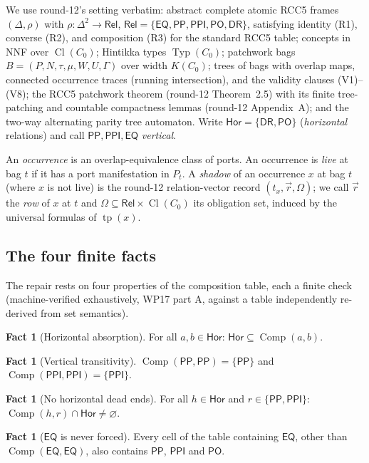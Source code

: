 \documentclass[11pt]{article}
\theoremstyle{definition}
\newtheorem{fact}[theorem]{Fact}
\newcommand{\EQ}{\mathsf{EQ}}
\newcommand{\PP}{\mathsf{PP}}
\newcommand{\PPI}{\mathsf{PPI}}
\newcommand{\PO}{\mathsf{PO}}
\newcommand{\DR}{\mathsf{DR}}
\newcommand{\Rel}{\mathsf{Rel}}
\newcommand{\Hor}{\mathsf{Hor}}
\newcommand{\Comp}{\operatorname{Comp}}
\newcommand{\Cl}{\operatorname{Cl}}
\newcommand{\Typ}{\operatorname{Typ}}
\newcommand{\tp}{\operatorname{tp}}
\begin{document}
We use round-12's setting verbatim: abstract complete atomic RCC5 frames
$(\Delta,\rho)$ with $\rho:\Delta^2\to\Rel$,
$\Rel=\{\EQ,\PP,\PPI,\PO,\DR\}$, satisfying identity (R1), converse (R2),
and composition (R3) for the standard RCC5 table; concepts in NNF over
$\Cl(C_0)$; Hintikka types $\Typ(C_0)$; patchwork bags
$B=(P,N,\tau,\mu,W,U,\Gamma)$ over width $K(C_0)$; trees of bags with
overlap maps, connected occurrence traces (running intersection), and the
validity clauses (V1)--(V8); the RCC5 patchwork theorem (round-12
Theorem~2.5) with its finite tree-patching and countable compactness
lemmas (round-12 Appendix~A); and the two-way alternating parity tree
automaton.  Write $\Hor=\{\DR,\PO\}$ (\emph{horizontal} relations) and
call $\PP,\PPI,\EQ$ \emph{vertical}.

An \emph{occurrence} is an overlap-equivalence class of ports.  An
occurrence is \emph{live} at bag $t$ if it has a port manifestation in
$P_t$.  A \emph{shadow} of an occurrence $x$ at bag $t$ (where $x$ is not
live) is the round-12 relation-vector record
$(t_x,\vec r,\Omega)$; we call $\vec r$ the \emph{row} of $x$ at $t$ and
$\Omega\subseteq\Rel\times\Cl(C_0)$ its obligation set, induced by the
universal formulas of $\tp(x)$.

\subsection{The four finite facts}

The repair rests on four properties of the composition table, each a
finite check (machine-verified exhaustively, WP17 part A, against a table
independently re-derived from set semantics).

\begin{fact}[Horizontal absorption]\label{fact:hor}
For all $a,b\in\Hor$: $\Hor\subseteq\Comp(a,b)$.
\end{fact}

\begin{fact}[Vertical transitivity]\label{fact:vert}
$\Comp(\PP,\PP)=\{\PP\}$ and $\Comp(\PPI,\PPI)=\{\PPI\}$.
\end{fact}

\begin{fact}[No horizontal dead ends]\label{fact:nodead}
For all $h\in\Hor$ and $r\in\{\PP,\PPI\}$:
$\Comp(h,r)\cap\Hor\neq\varnothing$.
\end{fact}

\begin{fact}[$\EQ$ is never forced]\label{fact:eq}
Every cell of the table containing $\EQ$, other than
$\Comp(\EQ,\EQ)$, also contains $\PP$, $\PPI$ and $\PO$.
\end{fact}
\end{document}
